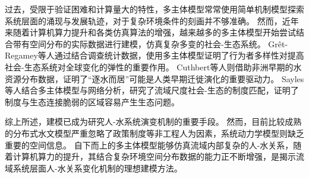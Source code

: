 过去，受限于验证困难和计算量大的特性，多主体模型常常使用简单机制模型探索系统层面的涌现与发展轨迹，对于复杂环境条件的刻画并不够准确\cite{biggs2021}。
然而，近年来随着计算机算力提升和各类仿真算法的增强，越来越多的多主体模型开始尝试结合带有空间分布的实际数据进行建模，仿真复杂多变的社会-生态系统\cite{steger2021}。
Grêt-Regamey等人通过结合调查统计数据，使用多主体模型证明了行为者多样性对提高社会-生态系统对全球变化的弹性的重要作用\cite{gret-regamey2019}。
Cuthbert等人则借助非洲早期的水资源分布数据，证明了“逐水而居”可能是人类早期迁徙演化的重要驱动力\cite{cuthbert2017}。
Sayles等人结合多主体模型与网络分析，研究了流域尺度社会-生态的制度匹配，证明了制度与生态连接脆弱的区域容易产生生态问题\cite{sayles2017}。

综上所述，建模已成为研究人-水系统演变机制的重要手段。
然而，目前比较成熟的分布式水文模型严重忽略了政策制度等非工程人为因素，系统动力学模型则缺乏重要的空间信息。
自下而上的多主体模型能够仿真流域内部复杂的人-水关系，随着计算机算力的提升，其结合复杂环境空间分布数据的能力正不断增强，是揭示流域系统层面人-水关系变化机制的理想建模方法。
